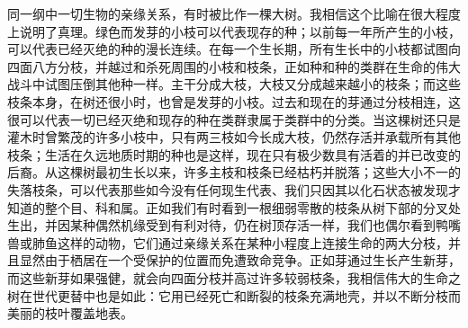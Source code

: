 {同一纲中一切生物的亲缘关系，有时被比作一棵大树。我相信这个比喻在很大程度上说明了真理。绿色而发芽的小枝可以代表现存的种；以前每一年所产生的小枝，可以代表已经灭绝的种的漫长连续。在每一个生长期，所有生长中的小枝都试图向四面八方分枝，并越过和杀死周围的小枝和枝条，正如种和种的类群在生命的伟大战斗中试图压倒其他种一样。主干分成大枝，大枝又分成越来越小的枝条；而这些枝条本身，在树还很小时，也曾是发芽的小枝。过去和现在的芽通过分枝相连，这很可以代表一切已经灭绝和现存的种在类群隶属于类群中的分类。当这棵树还只是灌木时曾繁茂的许多小枝中，只有两三枝如今长成大枝，仍然存活并承载所有其他枝条；生活在久远地质时期的种也是这样，现在只有极少数具有活着的并已改变的后裔。从这棵树最初生长以来，许多主枝和枝条已经枯朽并脱落；这些大小不一的失落枝条，可以代表那些如今没有任何现生代表、我们只因其以化石状态被发现才知道的整个目、科和属。正如我们有时看到一根细弱零散的枝条从树下部的分叉处生出，并因某种偶然机缘受到有利对待，仍在树顶存活一样，我们也偶尔看到鸭嘴兽或肺鱼这样的动物，它们通过亲缘关系在某种小程度上连接生命的两大分枝，并且显然由于栖居在一个受保护的位置而免遭致命竞争。正如芽通过生长产生新芽，而这些新芽如果强健，就会向四面分枝并高过许多较弱枝条，我相信伟大的生命之树在世代更替中也是如此：它用已经死亡和断裂的枝条充满地壳，并以不断分枝而美丽的枝叶覆盖地表。}
